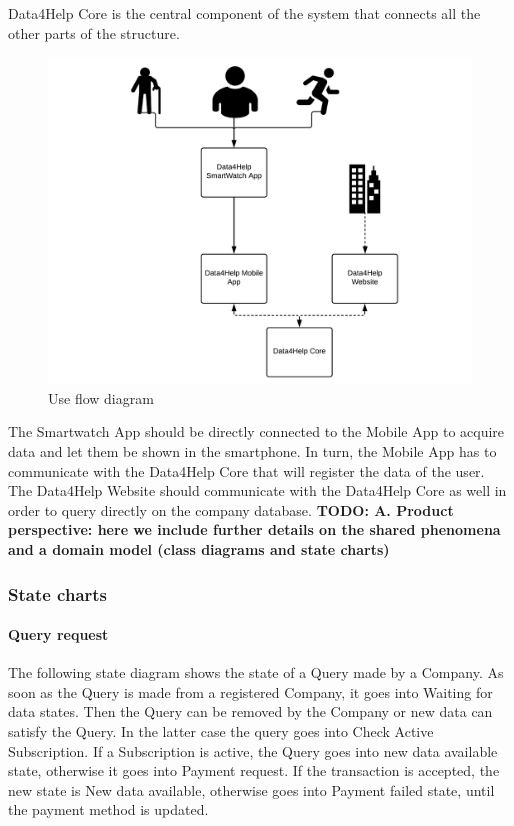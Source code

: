 Data4Help Core is the central component of the system that connects all the other parts of the structure.

\begin{figure}[H]
	\includegraphics[width=\textwidth,height=\textheight,keepaspectratio]{assets/useflow.pdf}
	\caption{Use flow diagram}
	\label{fig:useflow}
\end{figure}

The Smartwatch App should be directly connected to the Mobile App to acquire data and let them be shown in the smartphone. In turn, the Mobile App has to communicate with the Data4Help Core that will register the data of the user. The Data4Help Website should communicate with the Data4Help Core as well in order to query directly on the company database.
\newline
\textbf{
TODO: 
A. Product perspective: here we include further details on the shared phenomena and a
domain model (\textbf{class diagrams and state charts)}
}

\subsubsection{State charts}

\paragraph{Query request}
The following state diagram shows the state of a Query made by a Company. As soon as the Query is made from a registered Company, it goes into Waiting for data states. Then the Query can be removed by the Company or new data can satisfy the Query. In the latter case the query goes into Check Active Subscription. If a Subscription is active, the Query goes into new data available state, otherwise it goes into Payment request. If the transaction is accepted, the new state is New data available, otherwise goes into Payment failed state, until the payment method is updated.

